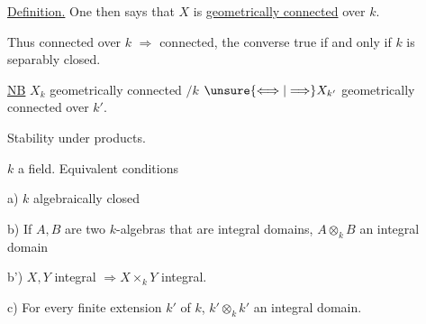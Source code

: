 
\uline{Definition.} One then says that $X$ is \uline{geometrically connected} over $k$.

Thus   connected over $k$ $\Rightarrow$ connected, the converse true if and only if $k$ is separably closed.

\uline{NB} $X_k$ geometrically connected $/k$ $\unsure{\Longleftrightarrow|\Longrightarrow} X_{k'}$ geometrically connected over $k'$.

Stability under products.


$k$ a field. Equivalent conditions


a) $k$ algebraically closed

b) If $A,B$ are two $k$-algebras that are integral domains, $A\otimes_k B$ an integral domain

b')  $X,Y$ integral $\Rightarrow X\times_k Y$ integral.

c) For every finite extension $k'$ of $k$, $k'\otimes_k k'$ an integral domain.

